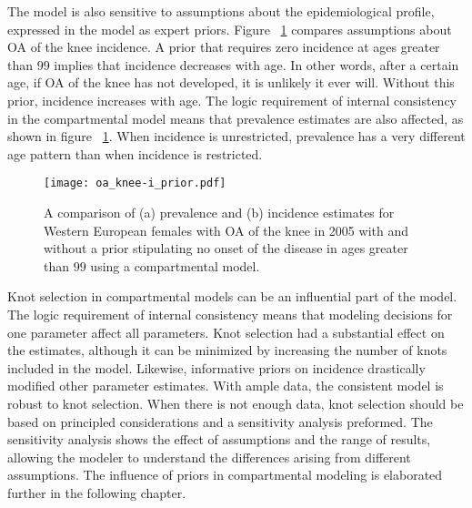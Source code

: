 The model is also sensitive to assumptions about the epidemiological
profile, expressed in the model as expert priors.  Figure
~\ref{fig:app-oa knee priors} compares assumptions about OA of the knee
incidence.  A prior that requires zero incidence at ages greater than
$99$ implies that incidence decreases with age.  In other words, after a
certain age, if OA of the knee has not developed, it is unlikely it ever
will. Without this prior, incidence increases with age.  The logic
requirement of internal consistency in the compartmental model means
that prevalence estimates are also affected, as shown in figure
~\ref{fig:app-oa knee priors}.  When incidence is unrestricted,
prevalence has a very different age pattern than when incidence is
restricted.

    \begin{figure}[h]
        \begin{center}
            \texttt{[image: oa\_knee-i\_prior.pdf]}
            \caption[Comparison of osteoarthritis of the knee estimates
              with and without a prior restricting the age of onset.]{A comparison
              of (a) prevalence and (b) incidence estimates
              for Western European females
              with OA of the knee in 2005 with and
              without a prior stipulating no onset of the disease in
              ages greater than $99$ using a compartmental model.}
            \label{fig:app-oa knee priors}
        \end{center}
    \end{figure}

Knot selection in compartmental models can be an influential part of
the model.  The logic requirement of internal consistency means that
modeling decisions for one parameter affect all parameters.  Knot
selection had a substantial effect on the estimates, although it can
be minimized by increasing the number of knots included in the model.
Likewise, informative priors on incidence drastically modified other
parameter estimates.  With ample data, the consistent model is robust
to knot selection.  When there is not enough data, knot selection should
be based on principled considerations and a sensitivity analysis preformed.
The sensitivity analysis shows the effect of assumptions and the range
of results, allowing the modeler to understand the differences arising
from different assumptions.  The influence of priors in compartmental
modeling is elaborated further in the following chapter.

